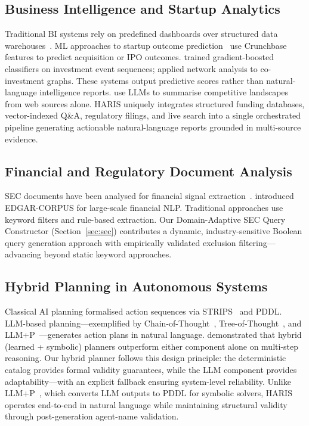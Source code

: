 \documentclass[preprint,12pt]{elsarticle}
\begin{document}
\subsection{Business Intelligence and Startup Analytics}

Traditional BI systems rely on predefined dashboards over structured data
warehouses~\cite{chaudhuri2011overview}. ML approaches to startup outcome
prediction~\cite{gastaud2019varying,lussier2010three} use Crunchbase features to
predict acquisition or IPO outcomes. \citet{sharchilev2018web} trained gradient-boosted
classifiers on investment event sequences; \citet{arroyo2022analysing} applied
network analysis to co-investment graphs. These systems output predictive scores
rather than natural-language intelligence reports. \citet{balaguer2023automating}
use LLMs to summarise competitive landscapes from web sources alone. HARIS
uniquely integrates structured funding databases, vector-indexed Q\&A, regulatory
filings, and live search into a single orchestrated pipeline generating actionable
natural-language reports grounded in multi-source evidence.

\subsection{Financial and Regulatory Document Analysis}

SEC documents have been analysed for financial signal
extraction~\cite{kogan2009predicting,loughran2011liability}.
\citet{loukas2021edgar} introduced EDGAR-CORPUS for large-scale financial NLP.
Traditional approaches use keyword filters and rule-based extraction. Our
Domain-Adaptive SEC Query Constructor (Section~\ref{sec:sec}) contributes a
dynamic, industry-sensitive Boolean query generation approach with empirically
validated exclusion filtering---advancing beyond static keyword approaches.

\subsection{Hybrid Planning in Autonomous Systems}

Classical AI planning formalised action sequences via STRIPS~\cite{fikes1971strips}
and PDDL. LLM-based planning---exemplified by Chain-of-Thought~\cite{wei2022},
Tree-of-Thought~\cite{yao2023tot}, and LLM+P~\cite{liu2023llmp}---generates
action plans in natural language. \citet{wu2023hybrid} demonstrated that hybrid
(learned + symbolic) planners outperform either component alone on multi-step
reasoning. Our hybrid planner follows this design principle: the deterministic
catalog provides formal validity guarantees, while the LLM component provides
adaptability---with an explicit fallback ensuring system-level reliability.
Unlike LLM+P~\cite{liu2023llmp}, which converts LLM outputs to PDDL for symbolic
solvers, HARIS operates end-to-end in natural language while maintaining
structural validity through post-generation agent-name validation.
\end{document}
